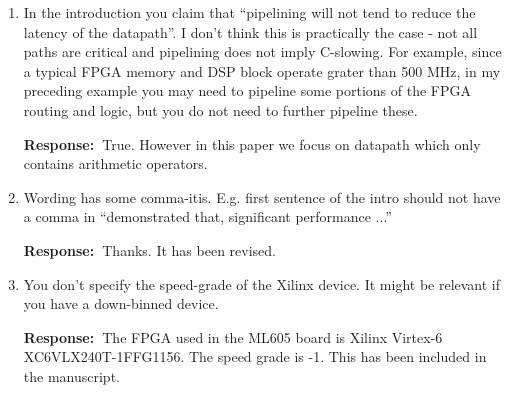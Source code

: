 \documentclass[a4paper, 11pt]{article}
\def\Response{\noindent \textbf{Response:~}}
\newcommand{\Question}[1]{\textcolor[rgb]{0.51,0.00,0.00}{#1}}
\begin{document}
\begin{enumerate}
      \Response The analytical model described in this manuscript is not specifically for FPGAs. Instead, it can be applied to general ripple-carry-based arithmetic operators, which is used in modern FPGAs. Hence there will be inaccuracies between the proposed model and the FPGA timing models. However as you mentioned, we use empirical results from FPGA to verify the model and to demonstrate the hypothesis. In this case, the assumptions in the models are relaxed. It can be seen from the manuscript that the model prediction matches well with the empirical results.

  \item \Question{In the introduction you claim that ``pipelining will not tend to reduce the latency of the datapath''. I don't think this is practically the case - not all paths are critical and pipelining does not imply C-slowing. For example, since a typical FPGA memory and DSP block operate grater than 500 MHz, in my preceding example you may need to pipeline some portions of the FPGA routing and logic, but you do not need to further pipeline these.}
      
      \Response True. However in this paper we focus on datapath which only contains arithmetic operators.
  
  \item \Question{Wording has some comma-itis. E.g. first sentence of the intro should not have a comma in ``demonstrated that, significant performance ...''}
      
      \Response Thanks. It has been revised.
      
  \item \Question{You don't specify the speed-grade of the Xilinx device. It might be relevant if you have a down-binned device.}
      
      \Response The FPGA used in the ML605 board is Xilinx Virtex-6 XC6VLX240T-1FFG1156. The speed grade is -1. This has been included in the manuscript.
\end{enumerate}
\end{document}
